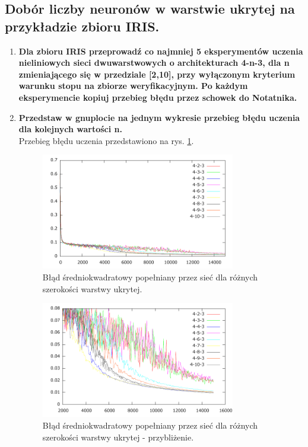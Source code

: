 \subsection{Dobór liczby neuronów w warstwie ukrytej na przykładzie zbioru IRIS.}
\begin{enumerate}
\item \textbf{ Dla zbioru IRIS przeprowadź co najmniej 5 eksperymentów uczenia nieliniowych sieci dwuwarstwowych o architekturach 4-n-3, dla n zmieniającego się w przedziale [2,10], przy wyłączonym kryterium warunku stopu na zbiorze weryfikacyjnym. Po każdym eksperymencie kopiuj przebieg błędu przez schowek do Notatnika.}

\item \textbf{
Przedstaw w gnuplocie na jednym wykresie przebieg błędu uczenia dla kolejnych wartości n.}
\\Przebieg błędu uczenia przedstawiono na rys. \ref{fig:errors4n3}.
\begin{figure}[h]
\centering
\includegraphics[width=0.8\textwidth]{dane/part1/zad4/errors4n3}
\caption{Błąd średniokwadratowy popełniany przez sieć dla różnych szerokości warstwy ukrytej.\label{fig:errors4n3}}
\end{figure}

\begin{figure}[h]
\centering
\includegraphics[width=0.8\textwidth]{dane/part1/zad4/errors4n3-zoom}
\caption{Błąd średniokwadratowy popełniany przez sieć dla różnych szerokości warstwy ukrytej - przybliżenie.\label{fig:errors4n3-zoom}}
\end{figure}


\end{enumerate}
